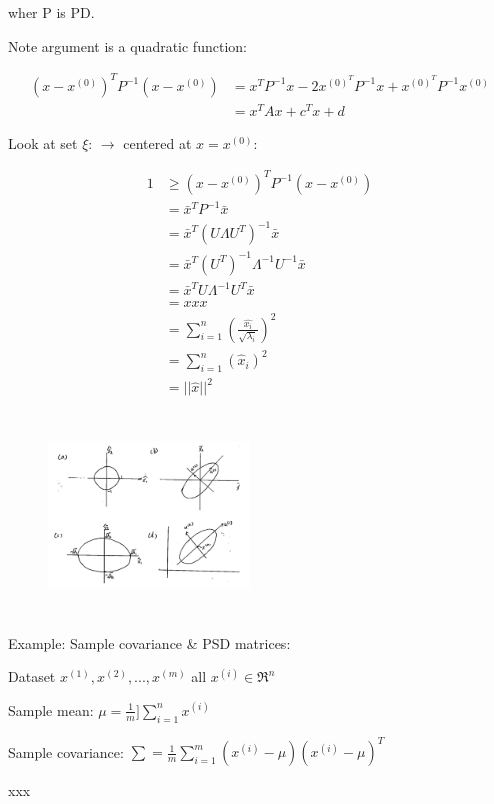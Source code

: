 wher P is PD.

Note argument is a quadratic function:

\begin{align*}
(x - x^{(0)})^TP^{-1}(x - x^{(0)}) &= x^TP^{-1}x - 2x^{(0)^T}P^{-1}x + x^{(0)^T}P^{-1}x^{(0)}\\
&= x^TAx + c^Tx + d
\end{align*}

Look at set $\xi$: $\rightarrow$ centered at $x = x^{(0)}$:

\begin{align*}
1 &\geq (x - x^{(0)})^TP^{-1}(x - x^{(0)})\\
&= \bar{x}^TP^{-1}\bar{x}\\
&= \bar{x}^T(U\Lambda U^T)^{-1}\bar{x}\\
&= \bar{x}^T(U^T)^{-1}\Lambda^{-1}U^{-1}\bar{x}\\
&= \bar{x}^TU\Lambda^{-1}U^T\bar{x}\\
&= xxx\\
&= \sum^n_{i=1}(\frac{\hat{x_i}}{\sqrt{\lambda_i}})^2\\
&= \sum^n_{i=1}(\hat{x}_i)^2\\
&= ||\hat{x}||^2
\end{align*}


\begin{figure}
	\centering
	\includegraphics[width=2.1in,height=2.1in]{figures/ch03/figure2.jpg}
\end{figure}

Example: Sample covariance \& PSD matrices: 

Dataset $x^{(1)}, x^{(2)}, ..., x^{(m)}$ all $x^{(i)}\in \Re^n$

Sample mean: $\mu = \frac{1}{m}]\sum^n_{i=1}x^{(i)}$

Sample covariance: $\sum = \frac{1}{m}\sum^m_{i=1}(x^{(i)}-\mu)(x^{(i)}-\mu)^T$

xxx

